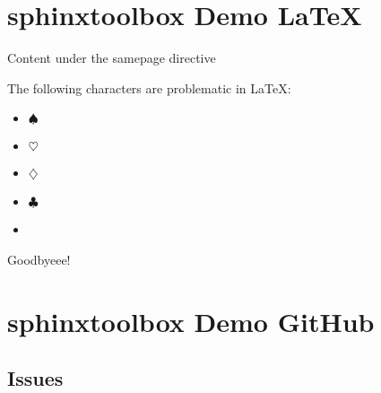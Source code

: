\documentclass[letterpaper,10pt,english]{sphinxmanual}
\begin{document}
\chapter{sphinx\sphinxhyphen{}toolbox Demo \sphinxhyphen{} LaTeX}
\label{\detokenize{latex:sphinx-toolbox-demo-latex}}\label{\detokenize{latex::doc}}
\clearpage

\par\begin{samepage}

Content under the samepage directive

\begin{figure}[htbp]
\centering

\noindent{}
\end{figure}

\end{samepage}\par

\cleardoublepage

The \hspace{0pt}following \hspace{0pt}characters \hspace{0pt}are \hspace{0pt}problematic \hspace{0pt}in \hspace{0pt}LaTeX:
\begin{itemize}
\item {}
 $\spadesuit$

\item {}
 $\heartsuit$

\item {}
 $\diamondsuit$

\item {}
 $\clubsuit$

\item {}
\textmu

\end{itemize}

\clearpage

Goodbyeee!


\chapter{sphinx\sphinxhyphen{}toolbox Demo \sphinxhyphen{} GitHub}
\label{\detokenize{github:sphinx-toolbox-demo-github}}\label{\detokenize{github::doc}}

\section{Issues}
\label{\detokenize{github:issues}}
\end{document}
